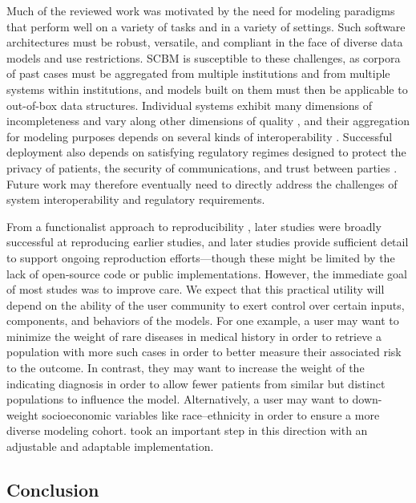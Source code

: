 \documentclass[sn-mathphys,Numbered,pdflatex]{sn-jnl}
\theoremstyle{remark}
\theoremstyle{definition}
\newcommand{\hl}[1]{#1}
\begin{document}
\hl{Much of the reviewed work was motivated by the need for modeling paradigms that perform well on a variety of tasks and in a variety of settings.
Such software architectures must be robust, versatile, and compliant in the face of diverse data models and use restrictions.
SCBM is susceptible to these challenges, as corpora of past cases must be aggregated from multiple institutions and from multiple systems within institutions, and models built on them must then be applicable to out-of-box data structures.
Individual systems exhibit many dimensions of incompleteness }\citep{Weiskopf2013}\hl{ and vary along other dimensions of quality }\citep{Kohane2021}\hl{, and their aggregation for modeling purposes depends on several kinds of interoperability }\citep{Weber2015}\hl{.
Successful deployment also depends on satisfying regulatory regimes designed to protect the privacy of patients, the security of communications, and trust between parties }\citep{Haendel2021}\hl{.
Future work may therefore eventually need to directly address the challenges of system interoperability and regulatory requirements.}

\hl{From a functionalist approach to reproducibility }\citep{Matarese2022}\hl{, later studies were broadly successful at reproducing earlier studies, and later studies provide sufficient detail to support ongoing reproduction efforts---though these might be limited by the lack of open-source code or public implementations.
However, the immediate goal of most studes was to improve care.
We expect that this practical utility will depend on the ability of the user community to exert control over certain inputs, components, and behaviors of the models.
For one example, a user may want to minimize the weight of rare diseases in medical history in order to retrieve a population with more such cases in order to better measure their associated risk to the outcome. In contrast, they may want to increase the weight of the indicating diagnosis in order to allow fewer patients from similar but distinct populations to influence the model. Alternatively, a user may want to down-weight socioeconomic variables like race--ethnicity in order to ensure a more diverse modeling cohort.
}\citet{Lopez2011}\hl{ took an important step in this direction with an adjustable and adaptable implementation.}

\subsection{\texorpdfstring{\hl{Conclusion}}{}}\label{section-1}
\end{document}
